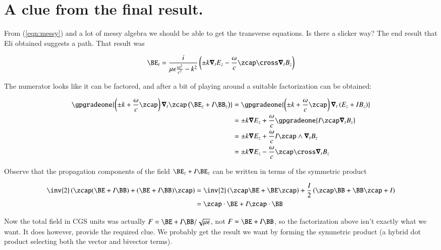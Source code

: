 \section{A clue from the final result.}

From (\ref{eqn:messy}) and a lot of messy algebra we should be able to get the transverse equations.  Is there a slicker way?  The end result that Eli obtained suggests a path.  That result was

\begin{align}\label{eqn:blah8}
\BE_t = \frac{i}{\mu\epsilon \frac{\omega^2}{c^2} - k^2} \left( \pm k \spacegrad_t E_z - \frac{\omega}{c} \zcap \cross \spacegrad_t B_z \right)
\end{align}

The numerator looks like it can be factored, and after a bit of playing around a suitable factorization can be obtained:

\begin{align*}
\gpgradeone{ \left( \pm k + \frac{\omega}{c} \zcap \right) \spacegrad_t \zcap \left( \BE_z + I \BB_z \right) }
&=
\gpgradeone{ \left( \pm k + \frac{\omega}{c} \zcap \right) \spacegrad_t \left( E_z + I B_z \right) } \\
&=
\pm k \spacegrad E_z + \frac{\omega}{c} \gpgradeone{ I \zcap \spacegrad_t B_z } \\
&=
\pm k \spacegrad E_z + \frac{\omega}{c} I \zcap \wedge \spacegrad_t B_z \\
&=
\pm k \spacegrad E_z - \frac{\omega}{c} \zcap \cross \spacegrad_t B_z \\
\end{align*}

Observe that the propagation components of the field $\BE_z + I\BE_z$ can be written in terms of the symmetric product

\begin{align*}
\inv{2} \left( \zcap (\BE + I\BB) + (\BE + I\BB) \zcap \right)
&=
\inv{2} \left( \zcap \BE + \BE \zcap \right) + \frac{I}{2} \left( \zcap \BB + \BB \zcap + I \right) \\
&=
\zcap \cdot \BE + I \zcap \cdot \BB
\end{align*}

Now the total field in CGS units was actually $F = \BE + I \BB/\sqrt{\mu\epsilon}$, not $F = \BE + I \BB$, so the factorization above isn't exactly what we want.   It does however, provide the required clue.  We probably get the result we want by forming the symmetric product (a hybrid dot product selecting both the vector and bivector terms).

